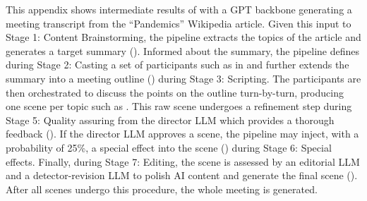 This appendix shows intermediate results of \pipeline{} with a GPT backbone generating a meeting transcript from the ``Pandemics'' Wikipedia article.
Given this input to Stage 1: Content Brainstorming, the pipeline extracts the topics of the article and generates a target summary ().
Informed about the summary, the pipeline defines during Stage 2: Casting a set of participants such as in  and further extends the summary into a meeting outline () during Stage 3: Scripting.
The participants are then orchestrated to discuss the points on the outline turn-by-turn, producing one scene per topic such as .
This raw scene undergoes a refinement step during Stage 5: Quality assuring from the director LLM which provides a thorough feedback ().
If the director LLM approves a scene, the pipeline may inject, with a probability of 25\%, a special effect into the scene () during Stage 6: Special effects.
Finally, during Stage 7: Editing, the scene is assessed by an editorial LLM and a detector-revision LLM to polish AI content %
and generate the final scene ().
After all scenes undergo this procedure, the whole meeting is generated.


